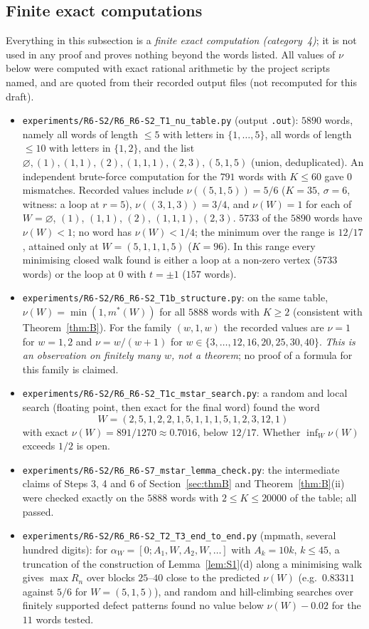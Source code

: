 \documentclass[11pt]{amsart}
\theoremstyle{definition}
\theoremstyle{remark}
\begin{document}
\subsection{Finite exact computations}\label{subsec:numerics}
Everything in this subsection is a \emph{finite exact computation (category~4)}; it is not used in any proof and
proves nothing beyond the words listed. All values of $\nu$ below were computed with exact rational arithmetic by
the project scripts named, and are quoted from their recorded output files (not recomputed for this draft).
\begin{itemize}
\item \texttt{experiments/R6-S2/R6\_R6-S2\_T1\_nu\_table.py} (output \texttt{.out}): $5890$ words, namely all words
of length $\le5$ with letters in $\{1,\dots,5\}$, all words of length $\le10$ with letters in $\{1,2\}$, and the
list $\varnothing,(1),(1,1),(2),(1,1,1),(2,3),(5,1,5)$ (union, deduplicated). An independent brute-force
computation for the $791$ words with $K\le60$ gave $0$ mismatches. Recorded values include $\nu((5,1,5))=5/6$ ($K=35$,
$\sigma=6$, witness: a loop at $r=5$), $\nu((3,1,3))=3/4$, and $\nu(W)=1$ for each of $W=\varnothing$, $(1)$,
$(1,1)$, $(2)$, $(1,1,1)$, $(2,3)$.
$5733$ of the $5890$ words have $\nu(W)<1$; no word has $\nu(W)<1/4$; the minimum over the range is $12/17$, attained
only at $W=(5,1,1,1,5)$ ($K=96$). In this range every minimising closed walk found is either a loop at a non-zero
vertex ($5733$ words) or the loop at $0$ with $t=\pm1$ ($157$ words).
\item \texttt{experiments/R6-S2/R6\_R6-S2\_T1b\_structure.py}: on the same table, $\nu(W)=\min(1,m^*(W))$ for all
$5888$ words with $K\ge2$ (consistent with Theorem~\ref{thm:B}). For the family $(w,1,w)$ the recorded values are
$\nu=1$ for $w=1,2$ and $\nu=w/(w+1)$ for $w\in\{3,\dots,12,16,20,25,30,40\}$. \emph{This is an observation on
finitely many $w$, not a theorem}; no proof of a formula for this family is claimed.
\item \texttt{experiments/R6-S2/R6\_R6-S2\_T1c\_mstar\_search.py}: a random and local search (floating point, then
exact for the final word) found the word
\[
W=(2,5,1,2,2,1,5,1,1,1,5,1,2,3,12,1)
\]
with exact $\nu(W)=891/1270\approx0.7016$, below $12/17$. Whether $\inf_W\nu(W)$ exceeds $1/2$ is open.
\item \texttt{experiments/R6-S2/R6\_R6-S7\_mstar\_lemma\_check.py}: the intermediate claims of Steps 3, 4 and 6 of
Section~\ref{sec:thmB} and Theorem~\ref{thm:B}(ii) were checked exactly on the $5888$ words with $2\le K\le20000$ of
the table; all passed.
\item \texttt{experiments/R6-S2/R6\_R6-S2\_T2\_T3\_end\_to\_end.py} (mpmath, several hundred digits): for
$\alpha_W=[0;A_1,W,A_2,W,\dots]$ with $A_k=10k$, $k\le45$, a truncation of the construction of
Lemma~\ref{lem:S1}(d) along a minimising walk gives $\max R_n$ over blocks $25$--$40$ close to the predicted $\nu(W)$
(e.g.\ $0.83311$ against $5/6$ for $W=(5,1,5)$), and random and hill-climbing searches over finitely supported
defect patterns found no value below $\nu(W)-0.02$ for the $11$ words tested.
\end{itemize}
\end{document}

